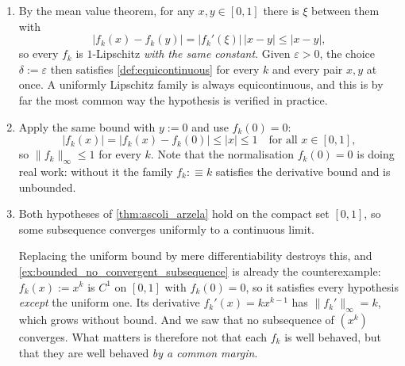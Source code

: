 \begin{exercisesolution}
\label{sol:uniform_lipschitz_family}
\begin{enumerate}[label=\textbf{(\alph*)}]
  \item By the mean value theorem, for any $x,y \in [0,1]$ there is $\xi$ between them with
    \[\lvert f_k(x)-f_k(y)\rvert = \lvert f_k'(\xi)\rvert\,\lvert x-y\rvert \leq \lvert x-y\rvert,\]
    so every $f_k$ is $1$-Lipschitz \emph{with the same constant}. Given $\varepsilon>0$, the
    choice $\delta := \varepsilon$ then satisfies \cref{def:equicontinuous} for every $k$ and
    every pair $x,y$ at once. A uniformly Lipschitz family is always equicontinuous, and this is
    by far the most common way the hypothesis is verified in practice.
  \item Apply the same bound with $y := 0$ and use $f_k(0)=0$:
    \[\lvert f_k(x)\rvert = \lvert f_k(x)-f_k(0)\rvert \leq \lvert x\rvert \leq 1
      \quad\text{for all } x \in [0,1],\]
    so $\lVert f_k\rVert_\infty \leq 1$ for every $k$. Note that the normalisation $f_k(0)=0$ is
    doing real work: without it the family $f_k :\equiv k$ satisfies the derivative bound and is
    unbounded.
  \item Both hypotheses of \cref{thm:ascoli_arzela} hold on the compact set $[0,1]$, so some
    subsequence converges uniformly to a continuous limit.

    Replacing the uniform bound by mere differentiability destroys this, and
    \cref{ex:bounded_no_convergent_subsequence} is already the counterexample: $f_k(x) := x^k$
    is $C^1$ on $[0,1]$ with $f_k(0)=0$, so it satisfies every hypothesis \emph{except} the
    uniform one. Its derivative $f_k'(x) = kx^{k-1}$ has $\lVert f_k'\rVert_\infty = k$, which
    grows without bound. And we saw that no subsequence of $(x^k)$ converges. What matters is
    therefore not that each $f_k$ is well behaved, but that they are well behaved \emph{by a
    common margin}.
\end{enumerate}
\end{exercisesolution}


